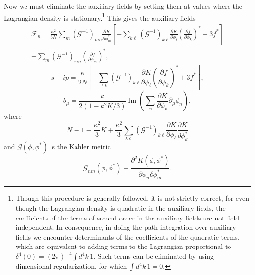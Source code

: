 Now we must eliminate the auxiliary fields by setting them at values
where the Lagrangian density is stationary.\footnote{Though this
procedure is generally followed, it is not strictly correct, for even
though the Lagrangian density is quadratic in the auxiliary fields, the
coefficients of the terms of second order in the auxiliary fields are
not field-independent. In consequence, in doing the path integration
over auxiliary fields we encounter determinants of the coefficients of
the quadratic terms, which are equivalent to adding terms to the
Lagrangian proportional to
\(\delta^4(0)=(2\pi)^{-4}\int d^4k\,1\). Such terms can be eliminated
by using dimensional regularization, for which \(\int d^4k\,1=0\).}
This gives the auxiliary fields
\begin{multline}
  \mathcal F_n
  =\frac{\kappa^2}{3N}\sum_m
    (\mathcal G^{-1})_{mn}
    \frac{\partial K}{\partial\phi_m^*}
    \left[
      -\sum_{k\ell}(\mathcal G^{-1})_{k\ell}
       \frac{\partial K}{\partial\phi_\ell}
       \left(\frac{\partial f}{\partial\phi_k}\right)^*
      +3f^*
    \right]\\
  -\sum_m(\mathcal G^{-1})_{mn}
    \left(\frac{\partial f}{\partial\phi_m}\right)^*,
  \tag{31.6.58}\label{eq:31.6.58}
\end{multline}
\begin{equation}
  s-ip
  =\frac{\kappa}{2N}\left[
    -\sum_{\ell k}(\mathcal G^{-1})_{k\ell}
      \frac{\partial K}{\partial\phi_\ell}
      \left(\frac{\partial f}{\partial\phi_k}\right)^*
    +3f^*
  \right],
  \tag{31.6.59}\label{eq:31.6.59}
\end{equation}
\begin{equation}
  b_\mu
  =\frac{\kappa}{2(1-\kappa^2K/3)}
    \operatorname{Im}\left(
      \sum_n\frac{\partial K}{\partial\phi_n}\partial_\mu\phi_n
    \right),
  \tag{31.6.60}\label{eq:31.6.60}
\end{equation}
where
\[
  N\equiv
  1-\frac{\kappa^2}{3}K
  +\frac{\kappa^2}{3}\sum_{k\ell}
    (\mathcal G^{-1})_{k\ell}
    \frac{\partial K}{\partial\phi_\ell}
    \frac{\partial K}{\partial\phi_k^*}
\]
and \(\mathcal G(\phi,\phi^*)\) is the Kahler metric
\begin{equation}
  \mathcal G_{nm}(\phi,\phi^*)
  \equiv
  \frac{\partial^2K(\phi,\phi^*)}
       {\partial\phi_n\partial\phi_m^*}.
  \tag{31.6.61}\label{eq:31.6.61}
\end{equation}

